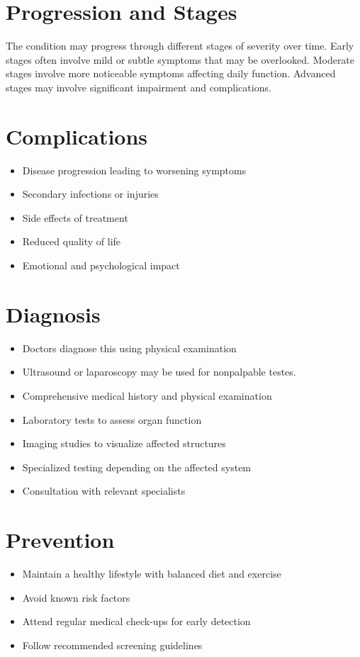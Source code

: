\section{Progression and Stages}
The condition may progress through different stages of severity over time. Early stages often involve mild or subtle symptoms that may be overlooked. Moderate stages involve more noticeable symptoms affecting daily function. Advanced stages may involve significant impairment and complications.
\section{Complications}
\begin{itemize}[noitemsep]
  \item Disease progression leading to worsening symptoms
  \item Secondary infections or injuries
  \item Side effects of treatment
  \item Reduced quality of life
  \item Emotional and psychological impact
\end{itemize}
\section{Diagnosis}
\begin{itemize}[noitemsep]
  \item Doctors diagnose this using physical examination
  \item Ultrasound or laparoscopy may be used for nonpalpable testes.
  \item Comprehensive medical history and physical examination
  \item Laboratory tests to assess organ function
  \item Imaging studies to visualize affected structures
  \item Specialized testing depending on the affected system
  \item Consultation with relevant specialists
\end{itemize}
\section{Prevention}
\begin{itemize}[noitemsep]
  \item Maintain a healthy lifestyle with balanced diet and exercise
  \item Avoid known risk factors
  \item Attend regular medical check-ups for early detection
  \item Follow recommended screening guidelines
\end{itemize}
